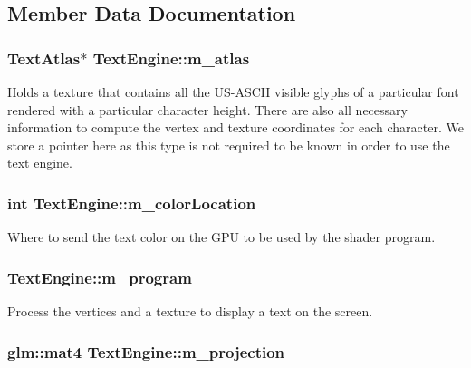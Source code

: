 \subsection{Member Data Documentation}
\hypertarget{classTextEngine_afd5f444cf365a23d5d811d79a1046e11}{
\subsubsection[{m\+\_\+atlas}]{\setlength{\rightskip}{0pt plus 5cm}Text\+Atlas$\ast$ Text\+Engine\+::m\+\_\+atlas\hspace{0.3cm}{\ttfamily [private]}}}\label{classTextEngine_afd5f444cf365a23d5d811d79a1046e11}
Holds a texture that contains all the U\+S-\/\+A\+S\+C\+I\+I visible glyphs of a particular font rendered with a particular character height. There are also all necessary information to compute the vertex and texture coordinates for each character. We store a pointer here as this type is not required to be known in order to use the text engine. \hypertarget{classTextEngine_a318576a75e542849a9a733c55823561e}{
\subsubsection[{m\+\_\+color\+Location}]{\setlength{\rightskip}{0pt plus 5cm}int Text\+Engine\+::m\+\_\+color\+Location\hspace{0.3cm}{\ttfamily [private]}}}\label{classTextEngine_a318576a75e542849a9a733c55823561e}
Where to send the text color on the G\+P\+U to be used by the shader program. \hypertarget{classTextEngine_a00abe5f39d00bc436937ab283e585f3f}{
\subsubsection[{m\+\_\+program}]{ Text\+Engine\+::m\+\_\+program\hspace{0.3cm}{\ttfamily [private]}}}\label{classTextEngine_a00abe5f39d00bc436937ab283e585f3f}
Process the vertices and a texture to display a text on the screen. \hypertarget{classTextEngine_af7f6f9d9abc900fa5383999f115e24ae}{
\subsubsection[{m\+\_\+projection}]{\setlength{\rightskip}{0pt plus 5cm}glm\+::mat4 Text\+Engine\+::m\+\_\+projection\hspace{0.3cm}{\ttfamily [private]}}}\label{classTextEngine_af7f6f9d9abc900fa5383999f115e24ae}
